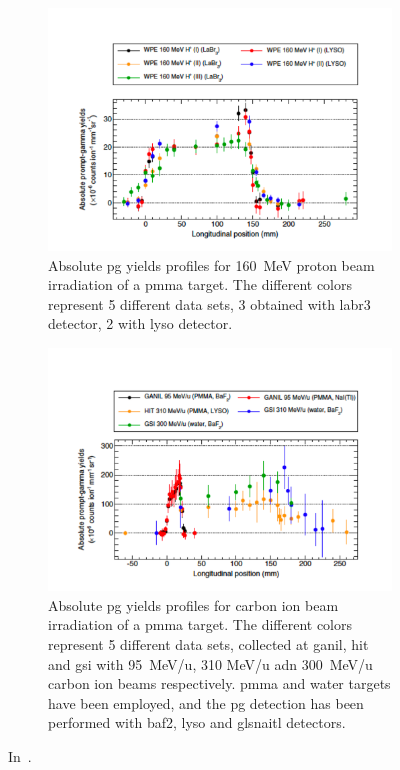 \begin{figure}
\centering
\begin{subfigure}[t]{.49\textwidth}
\hspace{-0.7cm}\includegraphics[width=1.2\linewidth]{03_GraphicFiles/chapter2_GammaCameras/PG_absYields_p.pdf}
\caption{Absolute \gls{pg} yields profiles for 160~MeV proton beam irradiation of a \gls{pmma} target. The different colors represent 5 different data sets, 3 obtained with \gls{labr3} detector, 2 with \gls{lyso} detector.}
\label{chap2::fig::PG_absYields_p}
\end{subfigure}
\begin{subfigure}[t]{.49\textwidth}
\hspace{-0.7cm}\includegraphics[width=1.2\linewidth]{03_GraphicFiles/chapter2_GammaCameras/PG_absYields_C.pdf}
\caption{Absolute \gls{pg} yields profiles for carbon ion beam irradiation of a \gls{pmma} target. The different colors represent 5 different data sets, collected at \gls{ganil}, \gls{hit} and \gls{gsi} with 95~MeV/u, 310 MeV/u adn 300~MeV/u carbon ion beams respectively. \gls{pmma} and water targets have been employed, and the \gls{pg} detection has been performed with \gls{baf2}, \gls{lyso} and gls{naitl} detectors.}
\label{chap2::fig::PG_absYields_C}
\end{subfigure}
\caption{In~\cite{Pinto2015}.}
\label{chap2::fig::PG_yields}
\end{figure}

